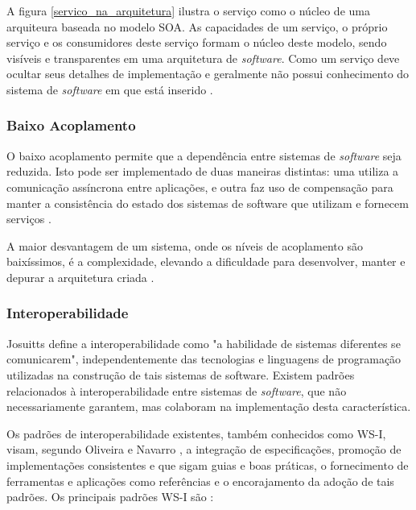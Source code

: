 A figura \ref{servico_na_arquitetura} ilustra o serviço como o núcleo de uma arquiteura baseada no modelo SOA. As capacidades de um serviço, o próprio serviço e os consumidores deste serviço formam o núcleo deste modelo, sendo visíveis e transparentes em uma arquitetura de \textit{software}. Como um serviço deve ocultar seus detalhes de implementação e geralmente não possui conhecimento do sistema de \textit{software} em que está inserido \cite{nickull_service_2007}.

\subsubsection{Baixo Acoplamento}
O baixo acoplamento permite que a dependência entre sistemas de \textit{software} seja reduzida. Isto pode ser implementado de duas maneiras distintas: uma utiliza a comunicação assíncrona entre aplicações, e outra faz uso de compensação para manter a consistência do estado dos sistemas de software que utilizam e fornecem serviços \cite{josuttis_soa_2007}.

A maior desvantagem de um sistema, onde os níveis de acoplamento são baixíssimos, é a complexidade, elevando a dificuldade para desenvolver, manter e depurar a arquitetura criada \cite{josuttis_soa_2007}.

\subsubsection{Interoperabilidade}
Josuitts \cite{josuttis_soa_2007} define a interoperabilidade como "a habilidade de sistemas diferentes se comunicarem", independentemente das tecnologias e linguagens de programação utilizadas na construção de tais sistemas de software. Existem padrões relacionados à interoperabilidade entre sistemas de \textit{software}, que não necessariamente garantem, mas colaboram na implementação desta característica. 

Os padrões de interoperabilidade existentes, também conhecidos como WS-I, visam, segundo Oliveira e Navarro \cite{oliveira_interoperabilidade}, a integração de especificações, promoção de implementações consistentes e que sigam guias e boas práticas, o fornecimento de ferramentas e aplicações como referências e o encorajamento da adoção de tais padrões. Os principais padrões WS-I são \cite{oliveira_interoperabilidade}:

